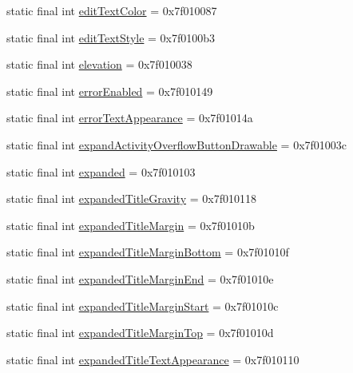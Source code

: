 \begin{CompactItemize}
\item 
static final int \hyperlink{classandroid_1_1support_1_1v4_1_1_r_1_1attr_a48b198050a49533e0cb20411066751f}{editTextColor} = 0x7f010087
\item 
static final int \hyperlink{classandroid_1_1support_1_1v4_1_1_r_1_1attr_0c88fc4cf3f5b3d10b1d052127727a0e}{editTextStyle} = 0x7f0100b3
\item 
static final int \hyperlink{classandroid_1_1support_1_1v4_1_1_r_1_1attr_0e0d61b87fd2656c5813cffe72aba679}{elevation} = 0x7f010038
\item 
static final int \hyperlink{classandroid_1_1support_1_1v4_1_1_r_1_1attr_198ced92428533a2ae62b0202ccbd099}{errorEnabled} = 0x7f010149
\item 
static final int \hyperlink{classandroid_1_1support_1_1v4_1_1_r_1_1attr_7a8ba1873ddf3d6cacab520516ac979a}{errorTextAppearance} = 0x7f01014a
\item 
static final int \hyperlink{classandroid_1_1support_1_1v4_1_1_r_1_1attr_a69106fdafa4c9a0e34c69f57a2a76e2}{expandActivityOverflowButtonDrawable} = 0x7f01003c
\item 
static final int \hyperlink{classandroid_1_1support_1_1v4_1_1_r_1_1attr_ac6e1f1b318f4c916f7f7e4da3133518}{expanded} = 0x7f010103
\item 
static final int \hyperlink{classandroid_1_1support_1_1v4_1_1_r_1_1attr_f40e3acc7c6ca0d3c2c99c1aa0f4d5ca}{expandedTitleGravity} = 0x7f010118
\item 
static final int \hyperlink{classandroid_1_1support_1_1v4_1_1_r_1_1attr_bfee3e18afa8fd56753671e71bb47850}{expandedTitleMargin} = 0x7f01010b
\item 
static final int \hyperlink{classandroid_1_1support_1_1v4_1_1_r_1_1attr_50f61f5d79e4689083dee57356df5145}{expandedTitleMarginBottom} = 0x7f01010f
\item 
static final int \hyperlink{classandroid_1_1support_1_1v4_1_1_r_1_1attr_b85d1b1d258e60585cb490e72403d5f9}{expandedTitleMarginEnd} = 0x7f01010e
\item 
static final int \hyperlink{classandroid_1_1support_1_1v4_1_1_r_1_1attr_8902290698ddfd5d24e6584d27277844}{expandedTitleMarginStart} = 0x7f01010c
\item 
static final int \hyperlink{classandroid_1_1support_1_1v4_1_1_r_1_1attr_fe32f2f15f147e260ef8595fb7a63093}{expandedTitleMarginTop} = 0x7f01010d
\item 
static final int \hyperlink{classandroid_1_1support_1_1v4_1_1_r_1_1attr_e526c5fb60b4d2c1d4b85bbf7e57167a}{expandedTitleTextAppearance} = 0x7f010110

\end{CompactItemize}
